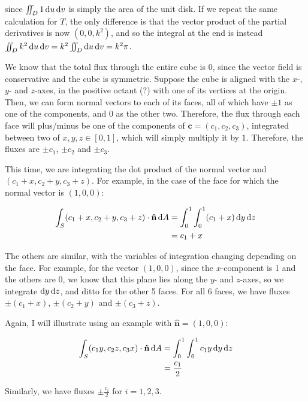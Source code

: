 since $\iint_D 1 \mathop{}\!\mathrm{d} u \mathop{}\!\mathrm{d} v$ is simply the area of the unit disk. If we repeat the same calculation for $T$, the only difference is that the vector product of the partial derivatives is now $(0, 0, k^2)$, and so the integral at the end is instead $\iint_D k^2 \mathop{}\!\mathrm{d} u \mathop{}\!\mathrm{d} v = k^2 \iint_D \mathop{}\!\mathrm{d} u \mathop{}\!\mathrm{d} v = k^2\pi$.



We know that the total flux through the entire cube is $0$, since the vector field is conservative and the cube is symmetric. Suppose the cube is aligned with the $x$-, $y$- and $z$-axes, in the positive octant (?) with one of its vertices at the origin. Then, we can form normal vectors to each of its faces, all of which have $\pm 1$ as one of the components, and 0 as the other two. Therefore, the flux through each face will plus/minus be one of the components of $\mathbf{c} = (c_1, c_2, c_3)$, integrated between two of $x, y, z \in [0, 1]$, which will simply multiply it by $1$. Therefore, the fluxes are $\pm c_1$, $\pm c_2$ and $\pm c_3$.

This time, we are integrating the dot product of the normal vector and $(c_1 + x, c_2 + y, c_3 + z)$. For example, in the case of the face for which the normal vector is $(1, 0, 0)$:

\begin{align*}
  \int_S (c_1 + x, c_2 + y, c_3 + z) \cdot \mathbf{\hat{n}} \mathop{}\!\mathrm{d} A &= \int_0^1 \int_0^1 (c_1 + x) \mathop{}\!\mathrm{d} y \mathop{}\!\mathrm{d} z \\
  &= c_1 + x
\end{align*}

The others are similar, with the variables of integration changing depending on the face. For example, for the vector $(1, 0, 0)$, since the $x$-component is 1 and the others are 0, we know that this plane lies along the $y$- and $z$-axes, so we integrate $\mathop{}\!\mathrm{d} y \mathop{}\!\mathrm{d} z$, and ditto for the other 5 faces. For all 6 faces, we have fluxes $\pm(c_1 + x)$, $\pm(c_2 + y)$ and $\pm(c_3 + z)$.

Again, I will illustrate using an example with $\mathbf{\hat{n}} = (1, 0, 0)$:

\begin{align*}
  \int_S (c_1y, c_2z, c_3x) \cdot \mathbf{\hat{n}} \mathop{}\!\mathrm{d} A &= \int_0^1 \int_0^1 c_1y \mathop{}\!\mathrm{d} y \mathop{}\!\mathrm{d} z \\
  &= \frac{c_1}{2}
\end{align*}

Similarly, we have fluxes $\pm\frac{c_i}{2}$ for $i = 1, 2, 3$.


